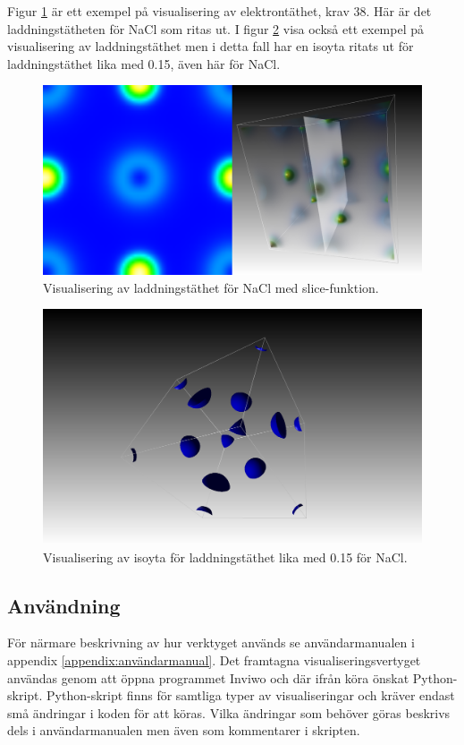 \documentclass[a4paper,12pt]{article}
\begin{document}
Figur \ref{fig:visualisering_NaCl_slice} är ett exempel på visualisering av elektrontäthet, krav 38. Här är det laddningstätheten för NaCl som ritas ut. I figur  \ref{fig:visualisering_NaCl_iso} visa också ett exempel på visualisering av laddningstäthet men i detta fall har en isoyta ritats ut för laddningstäthet lika med 0.15, även här för NaCl.

\begin{figure}[H]
	\centering
	\includegraphics[scale=0.2]{NaCl_laddningstathet_slice_visualisering.png}
	\caption{Visualisering av laddningstäthet för NaCl med slice-funktion.}
	\label{fig:visualisering_NaCl_slice}
\end{figure}

\begin{figure}[H]
	\centering
	\includegraphics[scale=0.2]{NaCl_laddningstathet_iso_visualisering.png}
	\caption{Visualisering av isoyta för laddningstäthet lika med 0.15 för NaCl.}
	\label{fig:visualisering_NaCl_iso}
\end{figure}

\subsection{Användning}
För närmare beskrivning av hur verktyget används se användarmanualen i appendix \ref{appendix:användarmanual}. Det framtagna visualiseringsvertyget användas genom att öppna programmet Inviwo och där ifrån köra önskat Python-skript. Python-skript finns för samtliga typer av visualiseringar och kräver endast små ändringar i koden för att köras. Vilka ändringar som behöver göras beskrivs dels i användarmanualen men även som kommentarer i skripten. %
\end{document}
